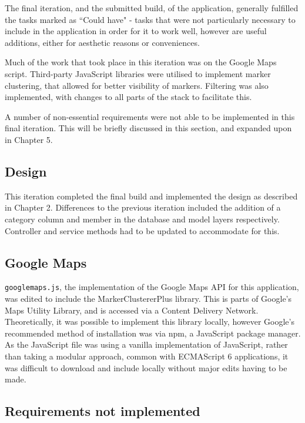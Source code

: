 The final iteration, and the submitted build, of the application, generally fulfilled the tasks marked as ``Could have" - tasks that were not particularly necessary to include in the application in order for it to work well, however are useful additions, either for aesthetic reasons or conveniences.

Much of the work that took place in this iteration was on the Google Maps script. Third-party JavaScript libraries were utilised to implement marker clustering, that allowed for better visibility of markers. Filtering was also implemented, with changes to all parts of the stack to facilitate this.

A number of non-essential requirements were not able to be implemented in this final iteration. This will be briefly discussed in this section, and expanded upon in Chapter 5.

\subsection{Design}

This iteration completed the final build and implemented the design as described in Chapter 2. Differences to the previous iteration included the addition of a category column and member in the database and model layers respectively. Controller and service methods had to be updated to accommodate for this.

\subsection{Google Maps}

\texttt{googlemaps.js}, the implementation of the Google Maps API for this application, was edited to include the MarkerClustererPlus library. This is parts of Google's Maps Utility Library, and is accessed via a Content Delivery Network. Theoretically, it was possible to implement this library locally, however Google's recommended method of installation was via npm, a JavaScript package manager. As the JavaScript file was using a vanilla implementation of JavaScript, rather than taking a modular approach, common with ECMAScript 6 applications, it was difficult to download and include locally without major edits having to be made.



\subsection{Requirements not implemented}
